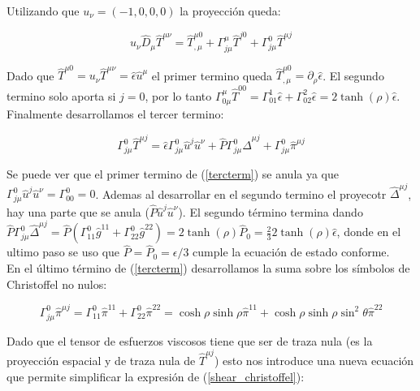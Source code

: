 \documentclass[11pt,a4paper]{article}
\begin{document}
Utilizando que $u_{\nu}=(-1,0,0,0)$ la proyección queda:

\begin{equation}
u_{\nu}\hat{D}_{\mu}\hat{T}^{{\mu}{\nu}}= \hat{T}^{{\mu}{0}}_{,\mu} +\Gamma^{\mu}_{{j}{\mu}}\hat{T}^{{j}{0}}+\Gamma^{0}_{{j}{\mu}}\hat{T}^{{\mu}{j}}
\label{cons_proy}
\end{equation}

Dado que $\hat{T}^{{\mu}{0}}=u_{\nu}\hat{T}^{{\mu}{\nu}}=\hat{\epsilon}\hat{u}^{\mu}$ el primer termino queda $\hat{T}^{{\mu}{0}}_{,\mu}={\partial}_{\rho}\hat{\epsilon}$. El segundo termino solo aporta si $j=0$, por lo tanto $\Gamma^{\mu}_{{0}{\mu}}\hat{T}^{{0}{0}}=\Gamma^{1}_{{0}{1}}\hat{\epsilon}+\Gamma^{2}_{{0}{2}}\hat{\epsilon}=2\tanh(\rho)\hat{\epsilon}$.
Finalmente desarrollamos el tercer termino:

\begin{equation}
\Gamma^{0}_{{j}{\mu}}\hat{T}^{{\mu}{j}}=\hat{\epsilon}\Gamma^{0}_{{j}{\mu}}\hat{u}^{j}\hat{u}^{\nu}+\hat{P}\Gamma^{0}_{{j}{\mu}}\hat{\Delta}^{{\mu}{j}}+\Gamma^{0}_{{j}{\mu}}\hat{\pi}^{{\mu}{j}}
\label{tercterm}
\end{equation}

Se puede ver que el primer termino de (\ref{tercterm}) se anula ya que $\Gamma^{0}_{{j}{\mu}}\hat{u}^{j}\hat{u}^{\nu}=\Gamma^{0}_{{0}{0}}=0$. Ademas al desarrollar en el segundo termino el proyecotr $\hat{\Delta}^{{\mu}{j}}$, hay una parte que se anula ($\hat{P}\hat{u}^{j}\hat{u}^{\nu}$). El segundo término termina dando $\hat{P}\Gamma^{0}_{{j}{\mu}}\hat{\Delta}^{{\mu}{j}}=\hat{P}(\Gamma^{0}_{{1}{1}}\hat{g}^{{1}{1}}+\Gamma^{0}_{{2}{2}}\hat{g}^{{2}{2}})=2\tanh(\rho)\hat{P}_{0}=\frac{2}{3}2\tanh(\rho)\hat{\epsilon}$, donde en el ultimo paso se uso que $\hat{P}=\hat{P}_{0}=\epsilon/3$ cumple la ecuación de estado conforme.\\





En el último término de (\ref{tercterm}) desarrollamos la suma sobre los símbolos de Christoffel no nulos:

\begin{equation}
\Gamma^{0}_{{j}{\mu}}\hat{\pi}^{{\mu}{j}}=\Gamma^{0}_{{1}{1}}\hat{\pi}^{{1}{1}}+\Gamma^{0}_{{2}{2}}\hat{\pi}^{{2}{2}}=\cosh\rho\sinh\rho\hat{\pi}^{{1}{1}}+\cosh\rho\sinh\rho\sin^2\theta\hat{\pi}^{{2}{2}}
\label{shear_christoffel}
\end{equation}


Dado que el tensor de esfuerzos viscosos tiene que ser de traza nula (es la proyección espacial y de traza nula de $\hat{T}^{{\mu}{j}}$) esto nos introduce una nueva ecuación que permite simplificar la expresión de (\ref{shear_christoffel}):
\end{document}
